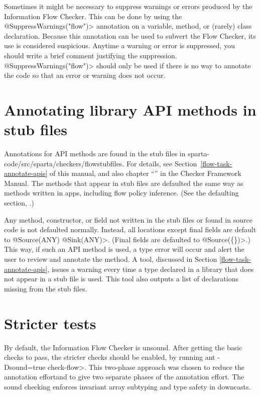 Sometimes it might be necessary to suppress warnings or errors produced by
the Information Flow Checker.  This can be done by using the
\<@SuppressWarnings("flow")> annotation on a variable, method, or (rarely)
class declaration.  Because this annotation can be used to subvert the Flow
Checker, its use is considered suspicious.  Anytime a warning or error is
suppressed, you should write a brief comment justifying the suppression.
\<@SuppressWarnings("flow")> should only be used if there is no way to
annotate the code so that an error or warning does not occur.  

\section{Annotating library API methods in stub files\label{sec:apispecs}}

Annotations for API methods are found in the stub files in sparta-code/src/sparta/checkers/flowstubfiles.
For details, see Section~\ref{flow-task-annotate-apis} of this manual, and also 
chapter
``'' in the Checker Framework Manual.  
 The methods that appear in stub files are defaulted the same way as methods 
written in apps, including flow policy inference.  
(See the defaulting section, .) 

Any method, constructor, or field  not written in the stub files or found in source code is not defaulted normally. 
 Instead,  all locations except final fields are default to \<@Source(ANY) @Sink(ANY)>.  
 (Final fields are defaulted to \<@Source(\{\})>.)
 This way, if such an API method is used, a type error
  will occur and alert the user to review and annotate the method. 
  A tool, discussed in Section \ref{flow-task-annotate-apis}, issues a warning every time a type declared in a 
  library that does not appear in a stub file is used.  This tool also outputs a list of declarations missing from
  the stub files. 
 
\section{Stricter tests\label{sec:stricter}}

By default, the Information Flow Checker is unsound.  After getting the basic checks to pass, the
 stricter checks should be enabled, by running \<ant -Dsound=true check-flow>.
This two-phase approach was chosen to reduce
the annotation effortand to give two separate phases of
the annotation effort.
 The sound checking enforces invariant 
array subtyping and type safety in downcasts.


